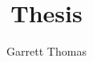 \documentclass[12pt,a4paper]{report}
\title{Thesis}
\author{Garrett Thomas}
\begin{document}
\maketitle
\tableofcontents
\newpage
\listoffigures
\newpage
\FloatBarrier

\newpage
\FloatBarrier

\newpage
\FloatBarrier

\newpage
\FloatBarrier

\newpage
\FloatBarrier

\newpage
\FloatBarrier



\newpage
\FloatBarrier


\end{document}
